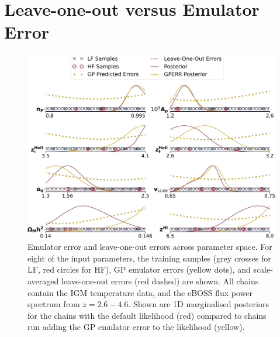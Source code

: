 

\section{Leave-one-out versus Emulator Error}
\label{sec:loovsgperr}
\begin{figure}
    \centering
    \includegraphics[width=\textwidth]{figures/loo_vs_emu_error_wlegend.pdf}
    \caption{\label{fig:loo_v_emu}
    Emulator error and leave-one-out errors across parameter space.
    For eight of the input parameters, the training samples (grey crosses for LF, red circles for HF), GP emulator errors (yellow dots), and scale-averaged leave-one-out errors (red dashed) are shown. All chains contain the IGM temperature data, and the eBOSS flux power spectrum from $z=2.6 - 4.6$.
    Shown are 1D marginalised posteriors for the chains with the default likelihood (red) compared to chains run adding the GP emulator error to the likelihood (yellow).
    }
\end{figure}


